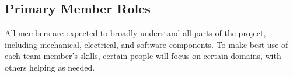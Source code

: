 \documentclass[11pt]{article}
\begin{document}
		
		\subsection{Primary Member Roles} %
		All members are expected to broadly understand all parts of the project, including mechanical, electrical, and software components. To make best use of each team member’s skills, certain people will focus on certain domains, with others helping as needed. 
	
\end{document}
